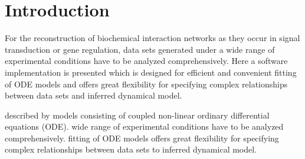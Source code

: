 \documentclass{bioinfo}
\begin{document}
\section{Introduction}
For the reconstruction of biochemical interaction networks as they occur in signal transduction 
or gene regulation, data sets generated under a wide range of experimental conditions have 
to be analyzed comprehensively.
Here a software implementation is presented which is designed for efficient and convenient 
fitting of ODE models and offers great flexibility for specifying complex relationships between 
data sets and inferred dynamical model.


described by models consisting of coupled non-linear ordinary differential equations (ODE). 
wide range of experimental conditions have to be analyzed comprehensively.
fitting of ODE models offers great flexibility for specifying complex relationships between data 
sets to inferred dynamical model.
\end{document}
